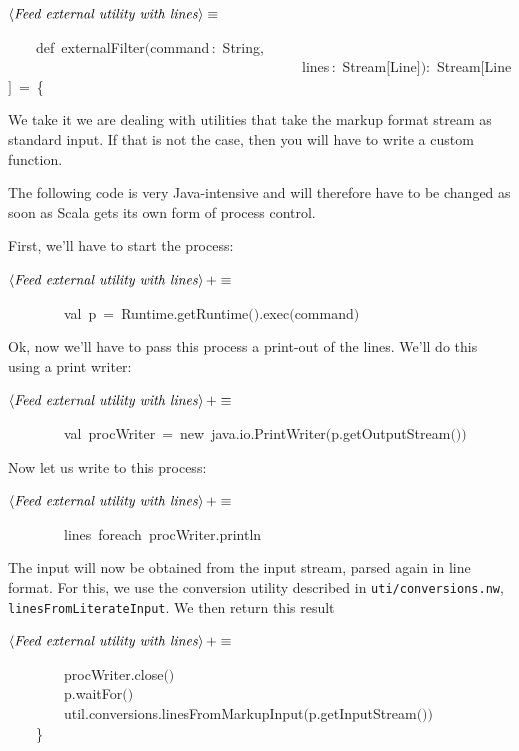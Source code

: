 \documentclass[a4paper,12pt]{article}
\begin{document}
$\left<\mbox{\emph{Feed external utility with lines}}\right>\equiv$
\begin{program}~~~~{\vem def}~externalFilter$($command\,{\rm :}~String,
\\~~~~~~~~~~~~~~~~~~~~~~~~~~~~~~~~~~~~~~~~~~lines\,{\rm :}~Stream$[$Line$]$$)${\rm :}~Stream$[$Line$]$~=~{\small\{}
\end{program}
We take it we are dealing with utilities that take the markup format stream
as standard input. If that is not the case, then you will have to write a custom
function.

The following code is very Java-intensive and will therefore have to be changed
as soon as Scala gets its own form of process control.

First, we'll have to start the process:

$\left<\mbox{\emph{Feed external utility with lines}}\right>+\equiv$
\begin{program}~~~~~~~~{\vem val}~p~=~Runtime.getRuntime$($$)$.exec$($command$)$
\\[0.5em]\end{program}
Ok, now we'll have to pass this process a print-out of the lines. We'll do this
using a print writer:

$\left<\mbox{\emph{Feed external utility with lines}}\right>+\equiv$
\begin{program}~~~~~~~~{\vem val}~procWriter~=~{\vem new}~java.io.PrintWriter$($p.getOutputStream$($$)$$)$
\\[0.5em]\end{program}
Now let us write to this process:

$\left<\mbox{\emph{Feed external utility with lines}}\right>+\equiv$
\begin{program}~~~~~~~~lines~foreach~procWriter.println
\\[0.5em]\end{program}
The input will now be obtained from the input stream, parsed again in line format.
For this, we use the conversion utility described in \texttt{uti/conversions.nw},
\texttt{linesFromLiterateInput}. We then return this result

$\left<\mbox{\emph{Feed external utility with lines}}\right>+\equiv$
\begin{program}~~~~~~~~procWriter.close$($$)$
\\~~~~~~~~p.waitFor$($$)$
\\~~~~~~~~util.conversions.linesFromMarkupInput$($p.getInputStream$($$)$$)$
\\~~~~{\small\}}
\\[0.5em]\end{program}
\end{document}
